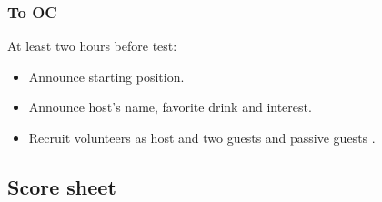 \subsubsection*{To OC}


At least two hours before test:
\begin{itemize}
	\item Announce starting position.
	\item Announce host's name, favorite drink and interest.
	\item Recruit volunteers as host and two guests and passive guests .
\end{itemize}

\subsection*{Score sheet}
